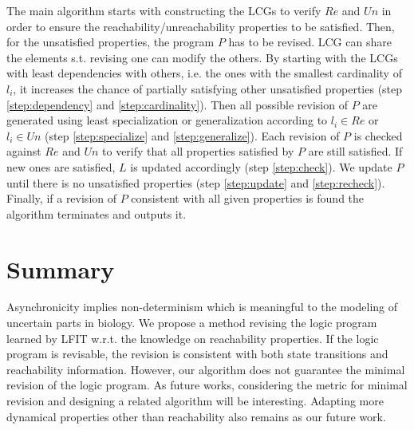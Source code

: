       
    The main algorithm starts with constructing the LCGs to verify $Re$ and $Un$ in order to ensure the reachability/unreachability properties to be satisfied.
    Then, for the unsatisfied properties, the program $P$ has to be revised.
    LCG can share the elements s.t. revising one can modify the others.
    By starting with the LCGs with least dependencies with others, i.e. the ones with the smallest cardinality of $l_i$, it increases the chance of partially satisfying other unsatisfied properties (step \ref{step:dependency} and \ref{step:cardinality}). 
    Then all possible revision of $P$ are generated using least specialization or generalization according to $l_i\in Re$ or $l_i \in Un$ (step \ref{step:specialize} and \ref{step:generalize}). 
    Each revision of $P$ is checked against $Re$ and $Un$ to verify that all properties satisfied by $P$ are still satisfied. 
    If new ones are satisfied, $L$ is updated accordingly (step \ref{step:check}).
    We update $P$ until there is no unsatisfied properties (step \ref{step:update} and \ref{step:recheck}).
    Finally, if a revision of $P$ consistent with all given properties is found the algorithm terminates and outputs it.
    
\section{Summary}
Asynchronicity implies non-determinism which is meaningful to the modeling of uncertain parts in biology.
We propose a method revising the logic program learned by LFIT w.r.t. the knowledge on reachability properties. If the logic program is revisable, the revision is consistent with both state transitions and reachability information.
However, our algorithm does not guarantee the minimal revision of the logic program.
As future works, considering the metric for minimal revision and designing a related algorithm will be interesting.
Adapting more dynamical properties other than reachability also remains as our future work.